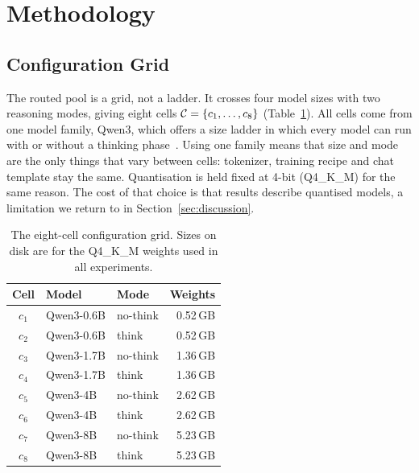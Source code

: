 \section{Methodology}
\label{sec:methodology}

\subsection{Configuration Grid}
\label{sec:grid}

The routed pool is a grid, not a ladder. It crosses four model sizes with
two reasoning modes, giving eight cells
$\mathcal{C} = \{c_1, \dots, c_8\}$ (Table~\ref{tab:grid}). All cells come from
one model family, Qwen3, which offers a size ladder in which every model can
run with or without a thinking phase~\cite{qwen3}. Using one family means
that size and mode are the only things that vary between cells: tokenizer,
training recipe and chat template stay the same. Quantisation is held fixed
at 4-bit (Q4\_K\_M) for the same reason. The cost of that choice is that
results describe quantised models, a limitation we return to in
Section~\ref{sec:discussion}.

\begin{table}[!t]
\centering
\caption{The eight-cell configuration grid. Sizes on disk are for the
Q4\_K\_M weights used in all experiments.}
\label{tab:grid}
\renewcommand{\arraystretch}{1.1}
\begin{tabular}{@{}c l l r@{}}
\toprule
Cell & Model & Mode & Weights \\
\midrule
$c_1$ & Qwen3-0.6B & no-think & 0.52\,GB \\
$c_2$ & Qwen3-0.6B & think    & 0.52\,GB \\
$c_3$ & Qwen3-1.7B & no-think & 1.36\,GB \\
$c_4$ & Qwen3-1.7B & think    & 1.36\,GB \\
$c_5$ & Qwen3-4B   & no-think & 2.62\,GB \\
$c_6$ & Qwen3-4B   & think    & 2.62\,GB \\
$c_7$ & Qwen3-8B   & no-think & 5.23\,GB \\
$c_8$ & Qwen3-8B   & think    & 5.23\,GB \\
\bottomrule
\end{tabular}
\end{table}

